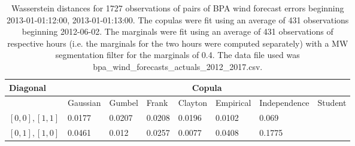 \begin{table}[h] 
    \centering 
    \begin{tabular}{|l|l|l|l|l|l|l|l|} \hline 
        \textbf{Diagonal} & \multicolumn{7}{c|}{\textbf{Copula}} \\ \hline 
        & Gaussian & Gumbel & Frank & Clayton & Empirical & Independence & Student \\ \hline 
        $[0,0], [1,1]$ & 0.0177 & 0.0207 & 0.0208 & 0.0196 & 0.0102 & 0.069 &  \\ \hline 
        $[0,1], [1,0]$ & 0.0461 & 0.012 & 0.0257 & 0.0077 & 0.0408 & 0.1775 &  \\ \hline 
    \end{tabular} 
    \caption{Wasserstein distances for 1727 observations of pairs of BPA wind forecast errors beginning 2013-01-01:12:00, 2013-01-01:13:00. The copulas were fit  using an average of 431 observations beginning 2012-06-02. The marginals were fit using an average of 431 observations of respective hours (i.e. the  marginals for the two hours were computed separately) with a MW segmentation filter for the marginals of 0.4. The data file used was bpa\_wind\_forecasts\_actuals\_2012\_2017.csv.} 
\end{table}